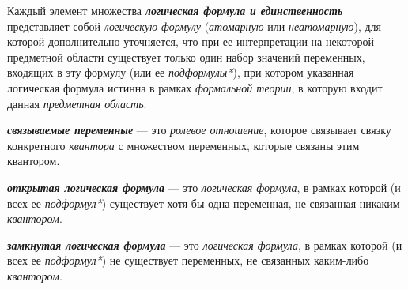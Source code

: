 Каждый элемент множества \textbf{\textit{логическая формула и единственность}} представляет собой \textit{логическую формулу} (\textit{атомарную} или \textit{неатомарную}), для которой дополнительно уточняется, что при ее интерпретации на некоторой предметной области существует только один набор значений переменных, входящих в эту формулу (или ее \textit{подформулы*}), при котором указанная логическая формула истинна в рамках \textit{формальной теории}, в которую входит данная \textit{предметная область}.



\textbf{\textit{связываемые переменные\scnrolesign}} --- это \textit{ролевое отношение}, которое связывает связку конкретного \textit{квантора} с множеством переменных, которые связаны этим квантором.

\textbf{\textit{открытая логическая формула}} --- это \textit{логическая формула}, в рамках которой (и всех ее \textit{подформул*}) существует хотя бы одна переменная, не связанная никаким \textit{квантором}.

\textbf{\textit{замкнутая логическая формула}} --- это \textit{логическая формула}, в рамках которой (и всех ее \textit{подформул*}) не существует переменных, не связанных каким-либо \textit{квантором}.


